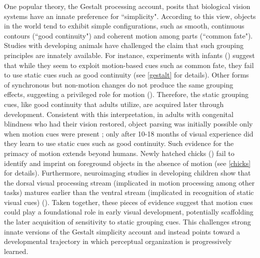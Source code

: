 \documentclass[10pt,letterpaper]{article}
\begin{document}
One popular theory, the Gestalt processing account, posits that biological vision systems have an innate preference for ``simplicity". According to this view, objects in the world tend to exhibit simple configurations, such as smooth, continuous contours (``good continuity") and coherent motion among parts (``common fate"). Studies with developing animals have challenged the claim that such grouping principles are innately available. For instance, experiments with infants (\cite{kellman1983perception}) suggest that while they seem to exploit motion-based cues such as common fate, they fail to use static cues such as good continuity (see \ref{gestalt} for details). Other forms of synchronous but non-motion changes do not produce the same grouping effects, suggesting a privileged role for motion (\cite{jusczyk1999synchronous}). Therefore, the static grouping cues, like good continuity that adults utilize, are acquired later through development. Consistent with this interpretation, in adults with congenital blindness who had their vision restored, object parsing was initially possible only when motion cues were present \cite{ostrovsky2009visual}; only after 10-18 months of visual experience did they learn to use static cues such as good continuity. Such evidence for the primacy of motion extends beyond humans. Newly hatched chicks (\cite{wood2021one}) fail to identify and imprint on foreground objects in the absence of motion (see \ref{chicks} for details). Furthermore, neuroimaging studies in developing children show that the dorsal visual processing stream (implicated in motion processing among other tasks) matures earlier than the ventral stream (implicated in recognition of static visual cues) (\cite{ciesielski2019maturational}). Taken together, these pieces of evidence suggest that motion cues could play a foundational role in early visual development, potentially scaffolding the later acquisition of sensitivity to static grouping cues. This challenges strong innate versions of the Gestalt simplicity account and instead points toward a developmental trajectory in which perceptual organization is progressively learned.
\end{document}
